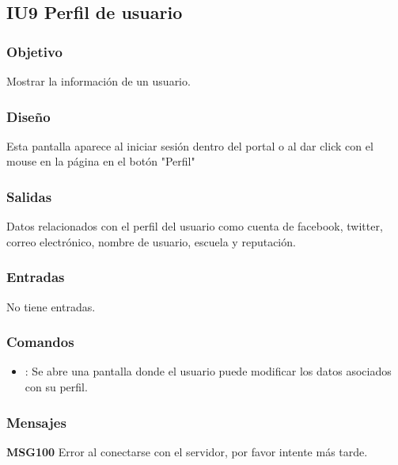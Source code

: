 \newpage
\subsection{IU9 Perfil de usuario}

\subsubsection{Objetivo}
	Mostrar la información de un usuario.
	
\subsubsection{Diseño}
	Esta pantalla aparece al iniciar sesión dentro del portal o al dar click con el mouse en la página en el botón "Perfil" 	


\subsubsection{Salidas}

	Datos relacionados con el perfil del usuario como cuenta de facebook, twitter, correo electrónico, nombre de usuario, escuela y reputación.

\subsubsection{Entradas}
	No tiene entradas.

\subsubsection{Comandos}
\begin{itemize}
	\item {}: Se abre una pantalla donde el usuario puede modificar los datos asociados con su perfil.
\end{itemize}

\subsubsection{Mensajes}
\begin{Citemize}
	\item {\bf MSG100} Error al conectarse con el servidor, por favor intente más tarde.
\end{Citemize}